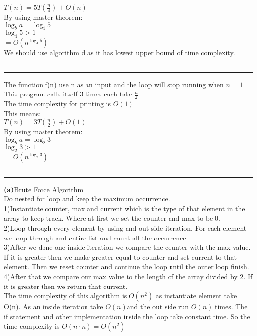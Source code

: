 \documentclass[a4paper, 11pt]{article}
\newcommand{\question}[2] {\vspace{.25in} \hrule\vspace{0.5em}
\noindent{\bf #1: #2} \vspace{0.5em}
\hrule \vspace{.10in}}
\renewcommand{\part}[1] {\vspace{.10in} {\bf (#1)}}
\begin{document}
$T(n)=5T(\frac{n}{4})+O(n)$\\
By using master theorem:\\
$\log_{b} a = \log_{4} 5$\\
$\log_{4} 5 > 1$\\
$=O(n^{\log_{4} 5})$\\
We should use algorithm d as it has lowest upper bound of time complexity.
\question{3}{Problem3}
The function f(n) use n as an input and the loop will stop running when $n=1$\\
This program calls itself 3 times each take $\frac{n}{2}$\\
The time complexity for printing is $O(1)$\\
This means:\\
$T(n)=3T(\frac{n}{2})+O(1)$\\
By using master theorem:\\
$\log_{b} a = \log_2 3$\\
$\log_2 3 > 1$\\
$=O(n^{\log_{2} 3})$

\question{4}{Problem4}
\part{a}{Brute Force Algorithm}\\
Do nested for loop and keep the maximum occurrence.\\ 
1)Instantiate counter, max and current which is the type of that element in the array to keep track. Where at first we set the counter and max to be 0.\\ 
2)Loop through every element by using and out side iteration. For each element we loop through and entire list and count all the occurrence.\\
3)After we done one inside iteration we compare the counter with the max value. If it is greater then we make greater equal to counter and set current to that element. Then we reset counter and continue the loop until the outer loop finish.\\
4)After that we compare our max value to the length of the array divided by 2. If it is greater then we return that current.\\
The time complexity of this algorithm is $O(n^{2})$ as instantiate element take O(n). As an inside iteration take $O(n)$and the out side run $O(n)$ times. The if statement and other implementation inside the loop take constant time. So the time complexity is $O(n \cdot n) = O(n^{2})$
\end{document}
